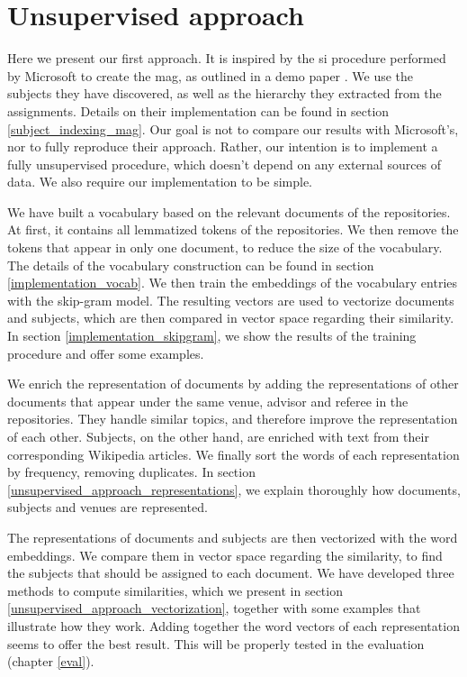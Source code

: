 \section{Unsupervised approach} \label{unsupervised_approach}

Here we present our first approach. It is inspired by the \acrfull{si} procedure performed by Microsoft to create the \acrfull{mag}, as outlined in a demo paper \cite{shen2018web}. We use the subjects they have discovered, as well as the hierarchy they extracted from the assignments. Details on their implementation can be found in section \ref{subject_indexing_mag}. Our goal is not to compare our results with Microsoft's, nor to fully reproduce their approach. Rather, our intention is to implement a fully unsupervised procedure, which doesn't depend on any external sources of data. We also require our implementation to be simple.

We have built a vocabulary based on the relevant documents of the repositories. At first, it contains all lemmatized tokens of the repositories. We then remove the tokens that appear in only one document, to reduce the size of the vocabulary. The details of the vocabulary construction can be found in section \ref{implementation_vocab}. We then train the embeddings of the vocabulary entries with the skip-gram model. The resulting vectors are used to vectorize documents and subjects, which are then compared in vector space regarding their similarity. In section \ref{implementation_skipgram}, we show the results of the training procedure and offer some examples.

We enrich the representation of documents by adding the representations of other documents that appear under the same venue, advisor and referee in the repositories. They handle similar topics, and therefore improve the representation of each other. Subjects, on the other hand, are enriched with text from their corresponding Wikipedia articles. We finally sort the words of each representation by frequency, removing duplicates. In section \ref{unsupervised_approach_representations}, we explain thoroughly how documents, subjects and venues are represented.

The representations of documents and subjects are then vectorized with the word embeddings. We compare them in vector space regarding the similarity, to find the subjects that should be assigned to each document. We have developed three methods to compute similarities, which we present in section \ref{unsupervised_approach_vectorization}, together with some examples that illustrate how they work. Adding together the word vectors of each representation seems to offer the best result. This will be properly tested in the evaluation (chapter \ref{eval}).

